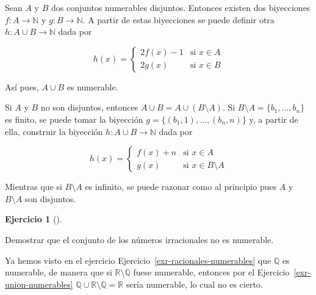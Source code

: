 \documentclass[
  a4paper,
]{scrreport}
\theoremstyle{definition}
\newtheorem{exercise}{Ejercicio}[chapter]
\theoremstyle{remark}
\begin{document}
\begin{tcolorbox}[enhanced jigsaw, coltitle=black, left=2mm, opacityback=0, colback=white, opacitybacktitle=0.6, breakable, colbacktitle=quarto-callout-tip-color!10!white, leftrule=.75mm, toptitle=1mm, arc=.35mm, bottomtitle=1mm, rightrule=.15mm, titlerule=0mm, title=\textcolor{quarto-callout-tip-color}{\faLightbulb}\hspace{0.5em}{Solución}, colframe=quarto-callout-tip-color-frame, toprule=.15mm, bottomrule=.15mm]
Sean \(A\) y \(B\) dos conjuntos numerables disjuntos. Entonces existen
dos biyecciones \(f:A\to \mathbb{N}\) y \(g:B\to \mathbb{N}\). A partir
de estas biyecciones se puede definir otra \(h:A\cup B\to \mathbb{N}\)
dada por

\[h(x)=
\begin{cases}
2f(x)-1 & \mbox{si } x\in A\\
2g(x) & \mbox{si } x\in B
\end{cases}
\]

Así pues, \(A\cup B\) es numerable.

Si \(A\) y \(B\) no son disjuntos, entonces
\(A\cup B=A\cup (B\setminus A)\). Si
\(B\setminus A=\{b_1,\ldots, b_n\}\) es finito, se puede tomar la
biyección \(g=\{(b_1,1),\ldots,(b_n,n)\}\) y, a partir de ella,
construir la biyección \(h:A\cup B\to \mathbb{N}\) dada por

\[h(x)=
\begin{cases}
f(x)+n & \mbox{si } x\in A\\
g(x) & \mbox{si } x\in B\setminus A
\end{cases}
\]

Mientras que si \(B\setminus A\) es infinito, se puede razonar como al
principio pues \(A\) y \(B\setminus A\) son disjuntos.
\end{tcolorbox}

\leavevmode{}%
\begin{exercise}[]\label{exr-irracionales-no-numerables}

Demostrar que el conjunto de los números irracionales no es numerable.

\end{exercise}

\begin{tcolorbox}[enhanced jigsaw, coltitle=black, left=2mm, opacityback=0, colback=white, opacitybacktitle=0.6, breakable, colbacktitle=quarto-callout-tip-color!10!white, leftrule=.75mm, toptitle=1mm, arc=.35mm, bottomtitle=1mm, rightrule=.15mm, titlerule=0mm, title=\textcolor{quarto-callout-tip-color}{\faLightbulb}\hspace{0.5em}{Solución}, colframe=quarto-callout-tip-color-frame, toprule=.15mm, bottomrule=.15mm]
Ya hemos visto en el ejercicio Ejercicio~\ref{exr-racionales-numerables}
que \(\mathbb{Q}\) es numerable, de manera que si
\(\mathbb{R}\setminus \mathbb{Q}\) fuese numerable, entonces por el
Ejercicio~\ref{exr-union-numerables}
\(\mathbb{Q}\cup \mathbb{R}\setminus \mathbb{Q}=\mathbb{R}\) sería
numerable, lo cual no es cierto.
\end{tcolorbox}
\end{document}
